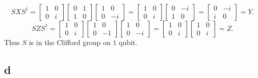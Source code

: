 \documentclass[letterpaper,12pt,oneside,onecolumn]{article}
\begin{document}
\paragraph{}
$$SXS^\dagger = \begin{bmatrix} 1 & 0 \\ 0 & i \end{bmatrix} \begin{bmatrix} 0 & 1 \\ 1 & 0 \end{bmatrix} \begin{bmatrix} 1 & 0\\ 0 & -i \end{bmatrix} = \begin{bmatrix} 1 & 0 \\ 0 & i \end{bmatrix} \begin{bmatrix} 0 & -i\\ 1 & 0 \end{bmatrix} =\begin{bmatrix} 0 & -i \\ i & 0 \end{bmatrix} = Y.$$
$$SZS^\dagger = \begin{bmatrix} 1 & 0 \\ 0 & i \end{bmatrix}\begin{bmatrix} 1 & 0 \\ 0 & -1\end{bmatrix} \begin{bmatrix} 1 & 0 \\0 & -i \end{bmatrix} = \begin{bmatrix} 1 & 0 \\ 0 & i \end{bmatrix}\begin{bmatrix} 1 & 0 \\ 0 & i \end{bmatrix} = Z.$$
Thus $S$ is in the Clifford group on $1$ qubit.
\subsection{d}
\end{document}

